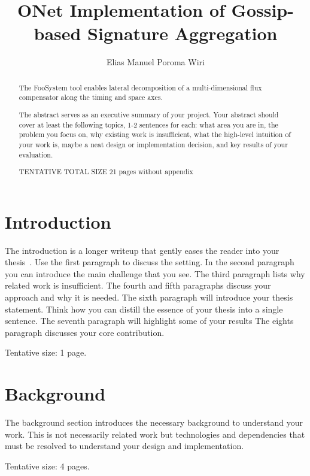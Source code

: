 \documentclass[a4paper,11pt,oneside]{report}
\title{ONet Implementation of Gossip-based Signature Aggregation}
\author{Elias Manuel Poroma Wiri}
\newcommand{\sysname}{FooSystem\xspace}
\begin{document}
\maketitle

\begin{abstract}
The \sysname tool enables lateral decomposition of a multi-dimensional
flux compensator along the timing and space axes.

The abstract serves as an executive summary of your project.
Your abstract should cover at least the following topics, 1-2 sentences for
each: what area you are in, the problem you focus on, why existing work is
insufficient, what the high-level intuition of your work is, maybe a neat
design or implementation decision, and key results of your evaluation.

TENTATIVE TOTAL SIZE 21 pages without appendix
\end{abstract}

\maketoc

\chapter{Introduction}

The introduction is a longer writeup that gently eases the reader into your
thesis~\cite{dinesh20oakland}. Use the first paragraph to discuss the setting.
In the second paragraph you can introduce the main challenge that you see.
The third paragraph lists why related work is insufficient.
The fourth and fifth paragraphs discuss your approach and why it is needed.
The sixth paragraph will introduce your thesis statement. Think how you can
distill the essence of your thesis into a single sentence.
The seventh paragraph will highlight some of your results
The eights paragraph discusses your core contribution.

Tentative size: 1 page.

\chapter{Background}

The background section introduces the necessary background to understand your
work. This is not necessarily related work but technologies and dependencies
that must be resolved to understand your design and implementation.

Tentative size: 4 pages.
\end{document}
